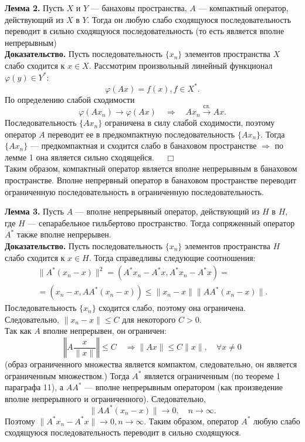 \documentclass[12pt,a4paper, titlepage]{article}
\begin{document}
\textbf{Лемма 2.} Пусть $X$ и $Y$ --- банаховы пространства, $A$ --- компактный оператор, действующий из $X$ в $Y$.
Тогда он любую слабо сходящуюся последовательность переводит в сильно сходящуюся последовательность (то есть является вполне непрерывным)%
\\
\textbf{Доказательство.} Пусть последовательность $\{x_n\}$ элементов пространства $X$ слабо сходится к $x \in X$. Рассмотрим произвольный линейный функционал $\varphi (y) \in Y^*$:
$$
\varphi (Ax) = f(x), f \in X^*.
$$
По определению слабой сходимости
$$
\varphi (Ax_n) \to \varphi (Ax) \quad \Rightarrow \quad Ax_n \xrightarrow{\text{сл.}} Ax.
$$
Последовательность $\{Ax_n\}$ ограничена в силу слабой сходимости, поэтому оператор $A$ переводит ее в предкомпактную последовательность $\{Ax_n\}$. Тогда $\{Ax_n\}$ --- предкомпактная и сходится слабо в банаховом пространстве $\Rightarrow$ по лемме 1 она является сильно сходящейся. $\quad \Box$\\

Таким образом, компактный оператор является вполне непрерывным в банаховом пространстве.
Вполне непрервный оператор в банаховом пространстве переводит ограниченную последовательность в ограниченную последовательность.

\textbf{Лемма 3.} Пусть $A$ --- вполне непрерывный оператор, действующий из $H$ в $H$, где $H$ --- сепарабельное гильбертово пространство. Тогда сопряженный оператор $A^*$ также вполне непрерывен.\\
\textbf{Доказательство.} Пусть последовательность $\{x_n\}$ элементов пространства $H$ слабо сходится к $x \in H$. Тогда справедливы следующие соотношения:
\begin{multline*}
\|A^*(x_n - x)\|^2 = (A^*x_n - A^*x, A^*x_n - A^*x) = \\
= (x_n - x, AA^*(x_n - x)) \leqslant \|x_n - x\| \|AA^* (x_n - x)\|.
\end{multline*}
Последовательность $\{x_n\}$ сходится слабо, поэтому она ограничена. Следовательно, $\|x_n - x\| \leqslant C$ для некоторого $C > 0$.\\

Так как $A$ вполне непрерывен, он ограничен:
$$
\left\Vert A \frac{x}{\|x\|} \right\Vert \leqslant C \quad \Rightarrow \|Ax\| \leqslant C\|x\|, \quad \forall x \neq 0
$$
(образ ограниченного множества является компактом, следовательно, он является ограниченным множеством.)
Тогда $A^*$ является ограниченным (по теореме 1 параграфа 11), а $AA^*$ --- вполне непрерывным оператором (как произведение вполне непрерывного и ограниченного). Следовательно,
$$
\|AA^*(x_n - x)\| \to 0, \quad n \to \infty.
$$
Поэтому $\|A^*x_n - A^*x\| \to 0, n \to \infty$. Таким образом, оператор $A^*$ любую слабо сходящуюся последовательность переводит в сильно сходящуюся.\\
\end{document}
